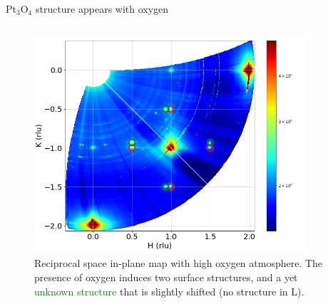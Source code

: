 \begin{frame}{Pt$_3$O$_4$ structure appears with oxygen}
\begin{columns}
    
        \begin{figure}
            \centering
            \includegraphics[width=0.9\textwidth]{Figures/sxrd_data/maps/Map_hkl_surf_or_1596-1635.png}
            \caption{Reciprocal space in-plane map with high oxygen atmosphere. The presence of oxygen induces two surface structures, \ptthreeofour and a yet \textcolor{green}{unknown structure} that is slightly shifted (no structure in L). }
            \label{fig:CondF1}
        \end{figure}
    
    \end{columns}

\end{frame}